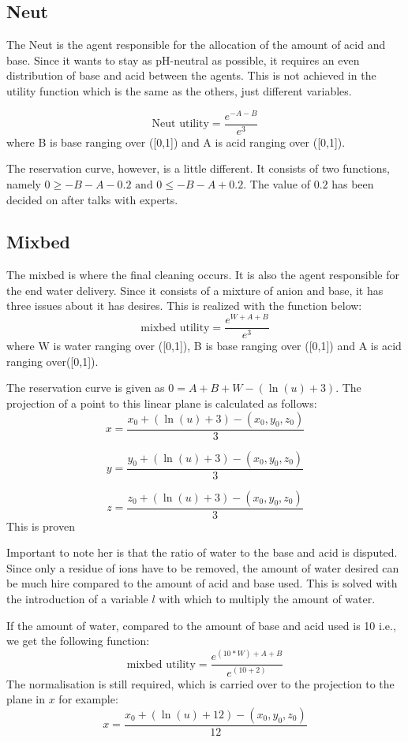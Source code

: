 \subsection{Neut}
The Neut is the agent responsible for the allocation of the amount of acid and base. Since it wants to stay as pH-neutral as possible, it requires an even distribution of base and acid between the agents. This is not achieved in the utility function which is the same as the others, just different variables.

\[
\text{Neut utility} = \frac{e^{-A-B}}{e^3}
\] 
where B is base ranging over ([0,1]) and A is acid ranging over ([0,1]).

The reservation curve, however, is a little different. It consists of two functions, namely $0 \geq -B - A - 0.2 \text{ and }  0 \leq -B - A + 0.2$. The value of $0.2$ has been decided on after talks with experts. 


\subsection{Mixbed}

The mixbed is where the final cleaning occurs. It is also the agent responsible for the end water delivery. Since it consists of a mixture of anion and base, it has three issues about it has desires. This is realized with the function below:
\[
\text{mixbed utility} = \frac{e^{W+A+B}}{e^3}
\] 
where W is water ranging over ([0,1]), B is base ranging over ([0,1]) and A is acid ranging over([0,1]).

The reservation curve is given as $0 = A+B+W - (\ln(u)+3)  $. The projection of a point to this linear plane is calculated as follows:
\[
x = \frac{x_0 + (\ln(u)+3) - (x_0, y_0, z_0)}{3}
\]

\[
y = \frac{y_0 + (\ln(u)+3) - (x_0, y_0, z_0)}{3} 
\]

\[
z = \frac{z_0 + (\ln(u)+3) - (x_0, y_0, z_0)}{3}
\]
This is proven 

Important to note her is that the ratio of water to the base and acid is disputed. Since only a residue of ions have to be removed, the amount of water desired can be much hire compared to the amount of acid and base used. This is solved with the introduction of a variable $l$ with which to multiply the amount of water. 

If the amount of water, compared to the amount of base and acid used is 10 i.e., we get the following function:
 \[
 \text{mixbed utility} = \frac{e^{(10*W)+A+B}}{e^(10+2)}
 \] 
The normalisation is still required, which is carried over to the projection to the plane in $x$ for example:
\[
x = \frac{x_0 + (\ln(u)+12) - (x_0, y_0, z_0)}{12}
\]
